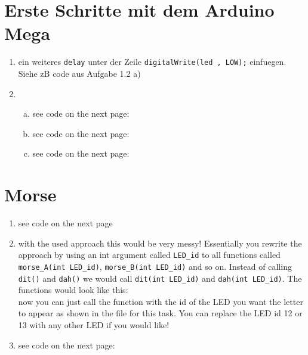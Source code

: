 \documentclass[12pt]{article}
\begin{document}
\lstset{language=C}

\section{ Erste Schritte mit dem Arduino Mega}
\begin{enumerate}
    \item 
        ein weiteres \verb!delay! unter der Zeile \verb!digitalWrite(led , LOW);! einfuegen. Siehe zB code aus Aufgabe 1.2 a)
        
    \item
        \begin{enumerate}[a)]
            \item 
                see code on the next page:\\
                

            \item
                see code on the next page:\\
                

            \item
                see code on the next page:\\
                
                
        \end{enumerate}
\end{enumerate}


\section{Morse}

\begin{enumerate}
    \item
        see code on the next page\\
        

    \item
        with the used approach this would be very messy! Essentially you rewrite the approach by using an int argument called \verb!LED_id! to all functions called \verb!morse_A(int LED_id)!, \verb!morse_B(int LED_id)! and so on. Instead of calling \verb! dit()! and \verb!dah()! we would call \verb!dit(int LED_id)! and \verb!dah(int LED_id)!. The functions would look like this:\\

        

        now you can just call the function with the id of the LED you want the letter to appear as shown in the file for this task. You can replace the LED id 12 or 13 with any other LED if you would like!

    \item
        see code on the next page:\\
        


\end{enumerate}
\end{document}
